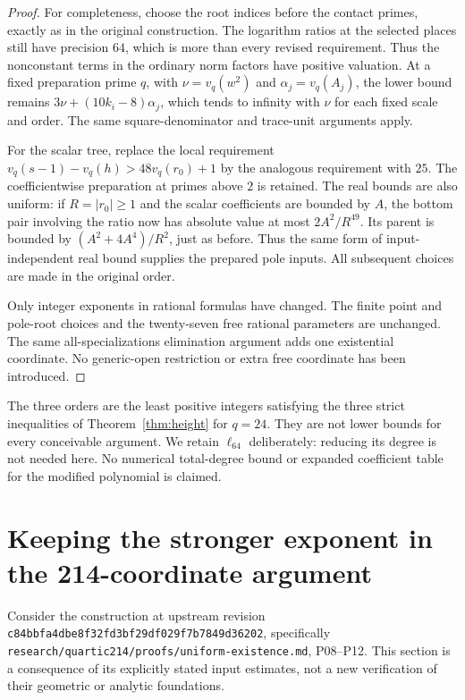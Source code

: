 \documentclass[11pt,a4paper]{article}
\begin{document}
\begin{proof}
For completeness, choose the root indices before the contact primes,
exactly as in the original construction. The logarithm ratios at the
selected places still have precision $64$, which is more than every
revised requirement. Thus the nonconstant terms in the ordinary norm
factors have positive valuation. At a fixed preparation prime $q$, with
$\nu=v_q(w^2)$ and $\alpha_j=v_q(A_j)$, the lower bound remains
$3\nu+(10k_i-8)\alpha_j$, which tends to infinity with $\nu$ for each
fixed scale and order. The same square-denominator and trace-unit
arguments apply.

For the scalar tree, replace the local requirement
$v_q(s-1)-v_q(h)>48v_q(r_0)+1$ by the analogous requirement with $25$.
The coefficientwise preparation at primes above $2$ is retained.
The real bounds are also uniform: if $R=|r_0|\ge1$ and the scalar
coefficients are bounded by $A$, the bottom pair involving the ratio
now has absolute value at most $2A^2/R^{49}$. Its parent is bounded
by $(A^2+4A^4)/R^2$, just as before. Thus the same form of input-independent
real bound supplies the prepared pole inputs. All subsequent choices
are made in the original order.

Only integer exponents in rational formulas have changed. The finite
point and pole-root choices and the twenty-seven free rational
parameters are unchanged. The same all-specializations elimination
argument adds one existential coordinate. No generic-open restriction
or extra free coordinate has been introduced.
\end{proof}
The three orders are the least positive integers satisfying the three
strict inequalities of Theorem~\ref{thm:height} for $q=24$.
They are not lower bounds for every conceivable argument. We retain
$\ell_{64}$ deliberately: reducing its degree is not needed here.
No numerical total-degree bound or expanded coefficient table for the
modified polynomial is claimed.

\section{Keeping the stronger exponent in the 214-coordinate argument}
Consider the construction at upstream revision
\texttt{c84bbfa4dbe8f32fd3bf29df029f7b7849d36202}, specifically
\nolinkurl{research/quartic214/proofs/uniform-existence.md}, P08--P12.
This section is a consequence of its explicitly stated input estimates,
not a new verification of their geometric or analytic foundations.
\end{document}
